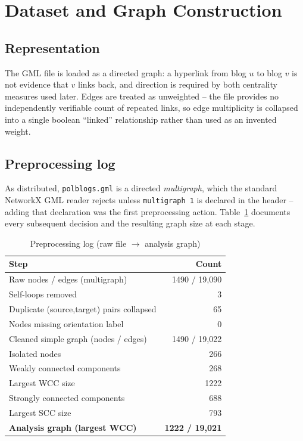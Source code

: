 \documentclass[10pt,conference]{IEEEtran}
\begin{document}
\section{Dataset and Graph Construction}
\label{sec:data}

\subsection{Representation}
The GML file is loaded as a directed graph: a hyperlink from blog $u$ to blog $v$ is not evidence
that $v$ links back, and direction is required by both centrality measures used later. Edges are
treated as unweighted -- the file provides no independently verifiable count of repeated links, so
edge multiplicity is collapsed into a single boolean ``linked'' relationship rather than used as an
invented weight.

\subsection{Preprocessing log}
As distributed, \texttt{polblogs.gml} is a directed \emph{multigraph}, which the standard NetworkX
GML reader rejects unless \texttt{multigraph~1} is declared in the header -- adding that declaration
was the first preprocessing action. Table~\ref{tab:preprocess} documents every subsequent decision
and the resulting graph size at each stage.

\begin{table}[h]
\centering
\caption{Preprocessing log (raw file $\rightarrow$ analysis graph)}
\label{tab:preprocess}
\small
\begin{tabular}{@{}lr@{}}
\toprule
Step & Count \\
\midrule
Raw nodes / edges (multigraph) & 1490 / 19{,}090 \\
Self-loops removed & 3 \\
Duplicate (source,target) pairs collapsed & 65 \\
Nodes missing orientation label & 0 \\
Cleaned simple graph (nodes / edges) & 1490 / 19{,}022 \\
Isolated nodes & 266 \\
Weakly connected components & 268 \\
Largest WCC size & 1222 \\
Strongly connected components & 688 \\
Largest SCC size & 793 \\
\textbf{Analysis graph (largest WCC)} & \textbf{1222 / 19{,}021} \\
\bottomrule
\end{tabular}
\end{table}
\end{document}
